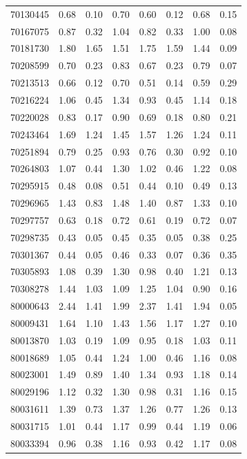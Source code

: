 \begin{small}
\begin{longtable}{|c|c c c|c c c|c|}
70130445 & 0.68 & 0.10 & 0.70 & 0.60 & 0.12 & 0.68 & 0.15 \\
70167075 & 0.87 & 0.32 & 1.04 & 0.82 & 0.33 & 1.00 & 0.08 \\
70181730 & 1.80 & 1.65 & 1.51 & 1.75 & 1.59 & 1.44 & 0.09 \\
70208599 & 0.70 & 0.23 & 0.83 & 0.67 & 0.23 & 0.79 & 0.07 \\
\rowcolor{lightgray}70213513 & 0.66 & 0.12 & 0.70 & 0.51 & 0.14 & 0.59 & 0.29 \\
70216224 & 1.06 & 0.45 & 1.34 & 0.93 & 0.45 & 1.14 & 0.18 \\
70220028 & 0.83 & 0.17 & 0.90 & 0.69 & 0.18 & 0.80 & 0.21 \\
70243464 & 1.69 & 1.24 & 1.45 & 1.57 & 1.26 & 1.24 & 0.11 \\
70251894 & 0.79 & 0.25 & 0.93 & 0.76 & 0.30 & 0.92 & 0.10 \\
70264803 & 1.07 & 0.44 & 1.30 & 1.02 & 0.46 & 1.22 & 0.08 \\
70295915 & 0.48 & 0.08 & 0.51 & 0.44 & 0.10 & 0.49 & 0.13 \\
70296965 & 1.43 & 0.83 & 1.48 & 1.40 & 0.87 & 1.33 & 0.10 \\
70297757 & 0.63 & 0.18 & 0.72 & 0.61 & 0.19 & 0.72 & 0.07 \\
\rowcolor{lightgray}70298735 & 0.43 & 0.05 & 0.45 & 0.35 & 0.05 & 0.38 & 0.25 \\
\rowcolor{lightgray}70301367 & 0.44 & 0.05 & 0.46 & 0.33 & 0.07 & 0.36 & 0.35 \\
70305893 & 1.08 & 0.39 & 1.30 & 0.98 & 0.40 & 1.21 & 0.13 \\
70308278 & 1.44 & 1.03 & 1.09 & 1.25 & 1.04 & 0.90 & 0.16 \\
80000643 & 2.44 & 1.41 & 1.99 & 2.37 & 1.41 & 1.94 & 0.05 \\
80009431 & 1.64 & 1.10 & 1.43 & 1.56 & 1.17 & 1.27 & 0.10 \\
80013870 & 1.03 & 0.19 & 1.09 & 0.95 & 0.18 & 1.03 & 0.11 \\
80018689 & 1.05 & 0.44 & 1.24 & 1.00 & 0.46 & 1.16 & 0.08 \\
80023001 & 1.49 & 0.89 & 1.40 & 1.34 & 0.93 & 1.18 & 0.14 \\
80029196 & 1.12 & 0.32 & 1.30 & 0.98 & 0.31 & 1.16 & 0.15 \\
80031611 & 1.39 & 0.73 & 1.37 & 1.26 & 0.77 & 1.26 & 0.13 \\
80031715 & 1.01 & 0.44 & 1.17 & 0.99 & 0.44 & 1.19 & 0.06 \\
80033394 & 0.96 & 0.38 & 1.16 & 0.93 & 0.42 & 1.17 & 0.08 \\

\end{longtable}
\end{small}
